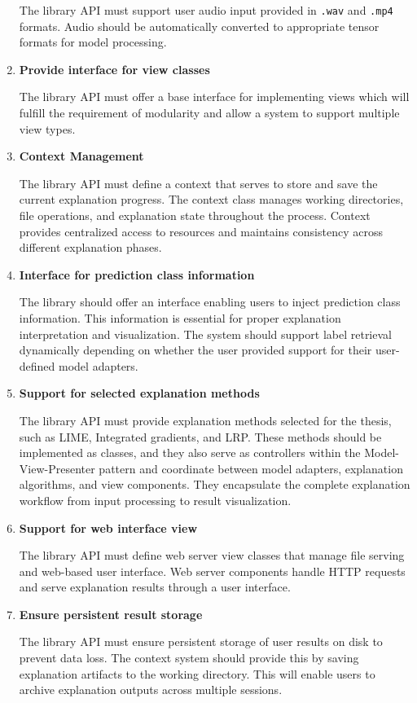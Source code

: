 \documentclass[
    bindingoffset=5mm,  %
    footnoteindent=3mm, %
    hyphenation=true    %
]{src/wut-thesis}
\begin{document}
\begin{enumerate}[itemsep=1\baselineskip]
        The library API must support user audio input provided in \texttt{.wav} and \texttt{.mp4} formats.
    Audio should be automatically converted to appropriate tensor formats for model processing.

    \item \textbf{Provide interface for view classes}

        The library API must offer a base interface for implementing views which will fulfill
    the requirement of modularity and allow a system to support multiple view types.

    \item \textbf{Context Management}

        The library API must define a context that serves to store and save the current explanation progress.
    The context class manages working directories, file operations, and explanation state throughout the process.
    Context provides centralized access to resources and maintains consistency across different explanation phases.

    \item \textbf{Interface for prediction class information}

        The library should offer an interface enabling users to inject prediction class information.
    This information is essential for proper explanation interpretation and visualization.
    The system should support label retrieval dynamically depending on whether the user provided
    support for their user-defined model adapters.

    \item \textbf{Support for selected explanation methods}

        The library API must provide explanation methods selected for the thesis, such as LIME, Integrated gradients, and LRP.
    These methods should be implemented as classes, and they also serve as controllers within
    the Model-View-Presenter pattern and coordinate between model adapters, explanation algorithms, and view components. They encapsulate the complete explanation workflow from input processing to result visualization.

    \item \textbf{Support for web interface view}

        The library API must define web server view classes that manage file serving and web-based user interface.
    Web server components handle HTTP requests and serve explanation results through a user interface.

    \item \textbf{Ensure persistent result storage}

        The library API must ensure persistent storage of user results on disk to prevent
    data loss. The context system should provide this by saving explanation artifacts to
    the working directory. This will enable users to archive explanation outputs across 
    multiple sessions.
    
    \end{enumerate}
\end{document}
